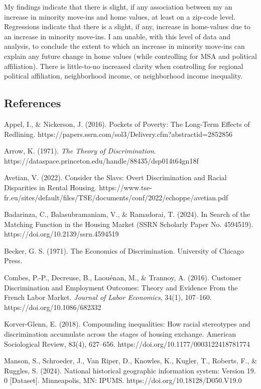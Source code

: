 \documentclass[11pt]{article}
\begin{document}
My findings indicate that there is slight, if any association between my
an increase in minority move-ins and home values, at least on a zip-code
level. Regressions indicate that there is a slight, if any, increase in
home-values due to an increase in minority move-ins. I am unable, with
this level of data and analysis, to conclude the extent to which an
increase in minority move-ins can explain any future change in home
values (while controlling for MSA and political affiliation). There is little-to-no increased
clarity when controlling for regional political affiliation,
neighborhood income, or neighborhood income inequality.

    \subsection{References}\label{references}

    Appel, I., \& Nickerson, J. (2016). Pockets of Poverty: The Long-Term Effects of Redlining. https://papers.ssrn.com/sol3/Delivery.cfm?abstractid=2852856

    Arrow, K. (1971). \textit{The Theory of Discrimination}. \\
    https://dataspace.princeton.edu/handle/88435/dsp014t64gn18f
    
    Avetian, V. (2022). Consider the Slavs: Overt Discrimination and Racial Disparities in Rental Housing. https://www.tse-fr.eu/sites/default/files/TSE/documents/conf/2022/echoppe/avetian.pdf
    
    Badarinza, C., Balasubramaniam, V., \& Ramadorai, T. (2024). In Search of the Matching Function in the Housing Market (SSRN Scholarly Paper No. 4594519). https://doi.org/10.2139/ssrn.4594519
    
    Becker, G. S. (1971). The Economics of Discrimination. University of Chicago Press.
    
    Combes, P.-P., Decreuse, B., Laouénan, M., \& Trannoy, A. (2016). Customer Discrimination and Employment Outcomes: Theory and Evidence From the French Labor Market. \textit{Journal of Labor Economics}, 34(1), 107–160. https://doi.org/10.1086/682332
    
    Korver-Glenn, E. (2018). Compounding inequalities: How racial stereotypes and discrimination accumulate across the stages of housing exchange. American Sociological Review, 83(4), 627–656. https://doi.org/10.1177/0003122418781774
    
    Manson, S., Schroeder, J., Van Riper, D., Knowles, K., Kugler, T., Roberts, F., \& Ruggles, S. (2024). National historical geographic information system: Version 19. 0 [Dataset]. Minneapolis, MN: IPUMS. https://doi.org/10.18128/D050.V19.0
    
\end{document}
